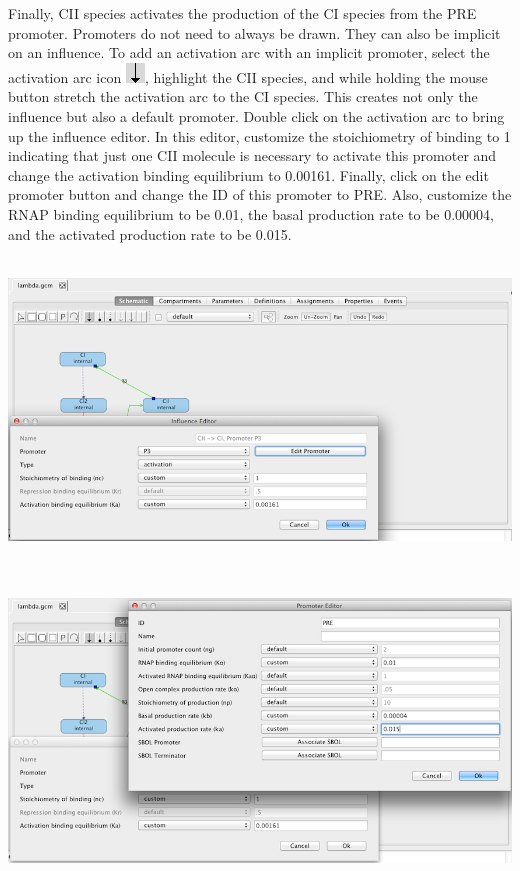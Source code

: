 \documentclass[titlepage,11pt]{article}
\begin{document}
Finally, CII species activates the production of the CI species from the PRE promoter.  Promoters do not need to always be drawn.  They can also be implicit on an influence.  To add an activation arc with an implicit promoter, select the activation arc icon \includegraphics{../gui/icons/modelview/activation_selected}, highlight the CII species, and while holding the mouse button stretch the activation arc to the CI species.  This creates not only the influence but also a default promoter.   Double click on the activation arc to bring up the influence editor.  In this editor, customize the stoichiometry of binding to 1 indicating that just one CII molecule is necessary to activate this promoter and change the activation binding equilibrium to 0.00161.  Finally, click on the edit promoter button and change the ID of this promoter to PRE.  Also, customize the RNAP binding equilibrium to be 0.01, the basal production rate to be 0.00004, and the activated production rate to be 0.015.

\begin{center}
\includegraphics[height=80mm]{screenshots/activation}
\end{center}

\begin{center}
\includegraphics[height=80mm]{screenshots/activated_promoter}
\end{center}
\end{document}
